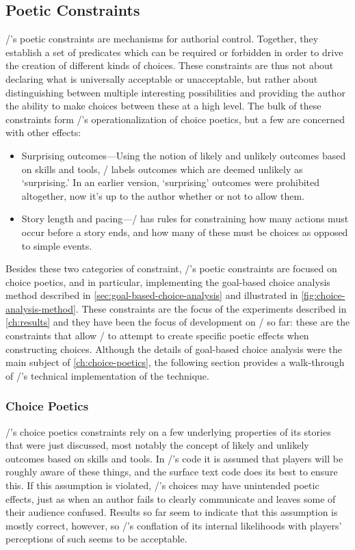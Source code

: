 \subsection{Poetic Constraints}
\label{sec:dunyazad-poetic-constraints}%

\dunyazad/'s poetic constraints are mechanisms for authorial control.
%
Together, they establish a set of predicates which can be required or forbidden in order to drive the creation of different kinds of choices.
%
These constraints are thus not about declaring what is universally acceptable or unacceptable, but rather about distinguishing between multiple interesting possibilities and providing the author the ability to make choices between these at a high level.
%
The bulk of these constraints form \dunyazad/'s operationalization of choice poetics, but a few are concerned with other effects:
%
\begin{itemize}
  \item Surprising outcomes---Using the notion of likely and unlikely outcomes based on skills and tools, \dunyazad/ labels outcomes which are deemed unlikely as `surprising.' In an earlier version, `surprising' outcomes were prohibited altogether, now it's up to the author whether or not to allow them.
  \item Story length and pacing---\dunyazad/ has rules for constraining how many actions must occur before a story ends, and how many of these must be choices as opposed to simple events.
\end{itemize}
%
Besides these two categories of constraint, \dunyazad/'s poetic constraints are focused on choice poetics, and in particular, implementing the goal-based choice analysis method described in \cref{sec:goal-based-choice-analysis} and illustrated in \cref{fig:choice-analysis-method}.
%
These constraints are the focus of the experiments described in \cref{ch:results} and they have been the focus of development on \dunyazad/ so far: these are the constraints that allow \dunyazad/ to attempt to create specific poetic effects when constructing choices.
%
Although the details of goal-based choice analysis were the main subject of \cref{ch:choice-poetics}, the following section provides a walk-through of \dunyazad/'s technical implementation of the technique.

\subsubsection{Choice Poetics}

\dunyazad/'s choice poetics constraints rely on a few underlying properties of its stories that were just discussed, most notably the concept of likely and unlikely outcomes based on skills and tools.
%
In \dunyazad/'s code it is assumed that players will be roughly aware of these things, and the surface text code does its best to ensure this.
%
If this assumption is violated, \dunyazad/'s choices may have unintended poetic effects, just as when an author fails to clearly communicate and leaves some of their audience confused.
%
Results so far seem to indicate that this assumption is mostly correct, however, so \dunyazad/'s conflation of its internal likelihoods with players' perceptions of such seems to be acceptable.


